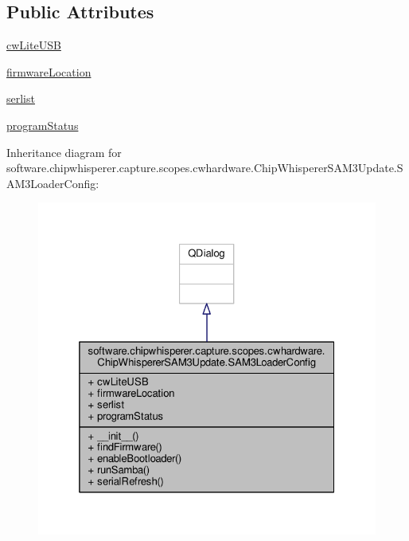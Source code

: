 \subsection*{Public Attributes}
\begin{DoxyCompactItemize}
\item 
\hyperlink{classsoftware_1_1chipwhisperer_1_1capture_1_1scopes_1_1cwhardware_1_1ChipWhispererSAM3Update_1_1SAM3LoaderConfig_ab6c5f4b307669348e28b7f1bcf7ea902}{cw\+Lite\+U\+S\+B}
\item 
\hyperlink{classsoftware_1_1chipwhisperer_1_1capture_1_1scopes_1_1cwhardware_1_1ChipWhispererSAM3Update_1_1SAM3LoaderConfig_aa0d7612fb970d062188efce9e01b7060}{firmware\+Location}
\item 
\hyperlink{classsoftware_1_1chipwhisperer_1_1capture_1_1scopes_1_1cwhardware_1_1ChipWhispererSAM3Update_1_1SAM3LoaderConfig_afffed2030c727f2d5d6bee1538766c47}{serlist}
\item 
\hyperlink{classsoftware_1_1chipwhisperer_1_1capture_1_1scopes_1_1cwhardware_1_1ChipWhispererSAM3Update_1_1SAM3LoaderConfig_aef902ef2dcfcc0c73adc1487ef0eef29}{program\+Status}
\end{DoxyCompactItemize}


Inheritance diagram for software.\+chipwhisperer.\+capture.\+scopes.\+cwhardware.\+Chip\+Whisperer\+S\+A\+M3\+Update.\+S\+A\+M3\+Loader\+Config\+:\nopagebreak
\begin{figure}[H]
\begin{center}
\leavevmode
\includegraphics[width=325pt]{dd/dab/classsoftware_1_1chipwhisperer_1_1capture_1_1scopes_1_1cwhardware_1_1ChipWhispererSAM3Update_1_1f52d2ec08efb94ded1fbde1e69aaab5f}
\end{center}
\end{figure}


